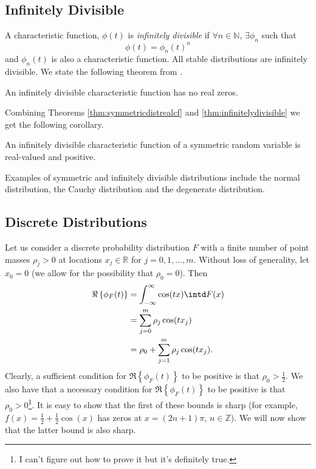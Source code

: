\subsection{Infinitely Divisible}
A characteristic function, $\phi(t)$ is \emph{infinitely divisible} if $\forall n \in \mathbb{N}$, $\exists \phi_n$ such that
$$\phi(t) = \phi_n(t)^n$$
and $\phi_n(t)$ is also a characteristic function. All stable distributions are infinitely divisible.
We state the following theorem from \cite{Lukacs1970-qm}.
\begin{theorem}
	An infinitely divisible characteristic function has no real zeros.
	\label{thm:infinitelydivisible}
\end{theorem}
Combining Theorems \ref{thm:symmetricdistrealcf} and \ref{thm:infinitelydivisible} we get the following corollary.
\begin{corollary}
	An infinitely divisible characteristic function of a symmetric random variable is real-valued and positive.
\end{corollary}
Examples of symmetric and infinitely divisible distributions include the normal distribution, the Cauchy distribution and the degenerate distribution.

\subsection{Discrete Distributions}
Let us consider a discrete probability distribution $F$ with a finite number of point masses $\rho_j > 0$ at locations $x_j \in \mathbb{R}$ for $j = 0,1,\dots,m$. Without loss of generality, let $x_0 = 0$ (we allow for the possibility that $\rho_0 = 0$). Then
\begin{align*}
\Re\left\lbrace\phi_F(t)\right\rbrace  &= \int_{-\infty}^\infty \cos(tx) \intd F(x)\\
&= \sum_{j = 0}^m \rho_j \cos(tx_j)\\
&= \rho_0 + \sum_{j = 1}^m \rho_j \cos(tx_j).\\
\end{align*}
Clearly, a sufficient condition for $\Re\left\lbrace \phi_F(t)\right\rbrace $ to be positive is that $\rho_0 > \frac{1}{2}$. We also have that a necessary condition for $\Re\left\lbrace \phi_F(t)\right\rbrace $ to be positive is that $\rho_0 > 0$\footnote{I can't figure out how to prove it but it's definitely true.}. It is easy to show that the first of these bounds is sharp (for example, $f(x) = \frac{1}{2} + \frac{1}{2} \cos(x)$ has zeros at $x = (2n+1)\pi$, $n \in \mathbb{Z}$). We will now show that the latter bound is also sharp.

